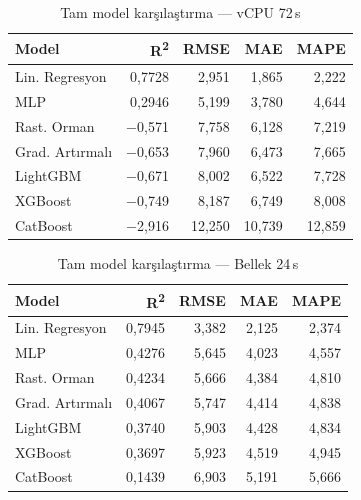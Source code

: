 \begin{ekler}
\begin{table}[htbp]
    \centering
    \caption{Tam model karşılaştırma — vCPU 72\,s}
    \begin{tabular}{lrrrr}
        \textbf{Model} & \textbf{R\textsuperscript{2}} & \textbf{RMSE} & \textbf{MAE} & \textbf{MAPE} \\
        \hline
        Lin. Regresyon  & 0{,}7728  & 2{,}951  & 1{,}865 & 2{,}222  \\
        MLP             & 0{,}2946  & 5{,}199  & 3{,}780 & 4{,}644  \\
        Rast. Orman     & $-$0{,}571 & 7{,}758 & 6{,}128 & 7{,}219  \\
        Grad. Artırmalı & $-$0{,}653 & 7{,}960 & 6{,}473 & 7{,}665  \\
        LightGBM        & $-$0{,}671 & 8{,}002 & 6{,}522 & 7{,}728  \\
        XGBoost         & $-$0{,}749 & 8{,}187 & 6{,}749 & 8{,}008  \\
        CatBoost        & $-$2{,}916 & 12{,}250 & 10{,}739 & 12{,}859 \\
    \end{tabular}
\end{table}

\begin{table}[htbp]
    \centering
    \caption{Tam model karşılaştırma — Bellek 24\,s}
    \begin{tabular}{lrrrr}
        \textbf{Model} & \textbf{R\textsuperscript{2}} & \textbf{RMSE} & \textbf{MAE} & \textbf{MAPE} \\
        \hline
        Lin. Regresyon  & 0{,}7945  & 3{,}382  & 2{,}125 & 2{,}374  \\
        MLP             & 0{,}4276  & 5{,}645  & 4{,}023 & 4{,}557  \\
        Rast. Orman     & 0{,}4234  & 5{,}666  & 4{,}384 & 4{,}810  \\
        Grad. Artırmalı & 0{,}4067  & 5{,}747  & 4{,}414 & 4{,}838  \\
        LightGBM        & 0{,}3740  & 5{,}903  & 4{,}428 & 4{,}834  \\
        XGBoost         & 0{,}3697  & 5{,}923  & 4{,}519 & 4{,}945  \\
        CatBoost        & 0{,}1439  & 6{,}903  & 5{,}191 & 5{,}666  \\
    \end{tabular}
\end{table}


\end{ekler}
